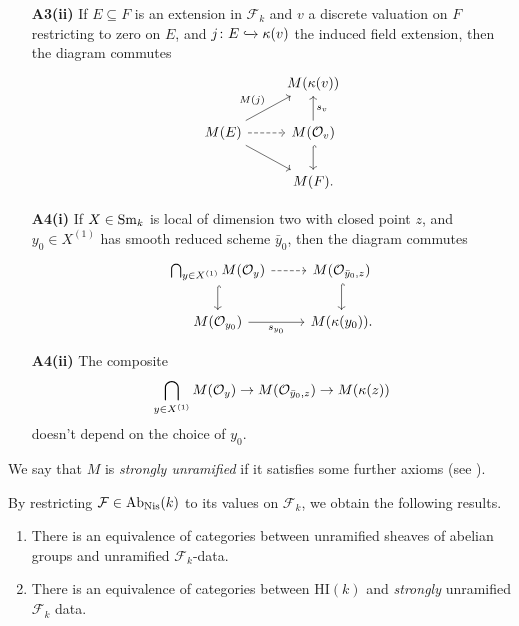 \documentclass[11pt,openany]{book}
\providecommand{\HI}{\mathrm{HI}}
\begin{document}
\begin{definition}
\begin{enumerate}
    \item[\textbf{A3(ii)}] If $E \subseteq F$ is an extension in $\mathcal{F}_k$ and $v$ a discrete valuation on $F$ restricting to zero on $E$, and $j \colon E \xhookrightarrow{} \kappa(v)$ the induced field extension, then the diagram commutes
\[ \begin{tikzcd}
     & M(\kappa(v))\\
    M(E)\ar[ur,"M(j)" above left]\ar[dr]\rar[dashed] & M(\O_v)\dar[hook]\uar["s_v" right]\\
     & M(F).
\end{tikzcd} \]
    
    \item[\textbf{A4(i)}] If $X\in \mathrm{Sm}_k$ is local of dimension two with closed point $z$, and $y_0 \in X^{(1)}$ has smooth reduced scheme $\bar{y}_0$, then the diagram commutes
\[ \begin{tikzcd}
    \bigcap_{y\in X^{(1)}} M(\O_y)\dar[hook]\rar[dashed] & M(\O_{\bar{y}_0,z})\dar[hook]\\
    M(\O_{y_0})\rar["s_{y_0}" below] & M(\kappa(y_0)).
\end{tikzcd} \]

    \item[\textbf{A4(ii)}] The composite
    \begin{align*}
        \bigcap_{y\in X^{(1)}}M(\mathcal{O}_y) \to M(\mathcal{O}_{\bar{y}_0,z}) \to M(\kappa(z))
    \end{align*}
    doesn't depend on the choice of $y_0$.
\end{enumerate}
We say that $M$ is \textit{strongly unramified} if it satisfies some further axioms (see \cite[\S2]{Morel}).
\end{definition}

\begin{theorem}\label{thm:restriction-to-Fk}
\cite[2.27]{Morel} By restricting $\mathcal{F}\in \mathrm{Ab}_{\mathrm{Nis}}(k)$ to its values on $\mathcal{F}_k$, we obtain the following results.
\begin{enumerate}
    \item There is an equivalence of categories between unramified sheaves of abelian groups and unramified $\mathcal{F}_k$-data.
    \item There is an equivalence of categories between $\HI(k)$ and \textit{strongly} unramified $\mathcal{F}_k$ data.
\end{enumerate}
\end{theorem}
\end{document}
